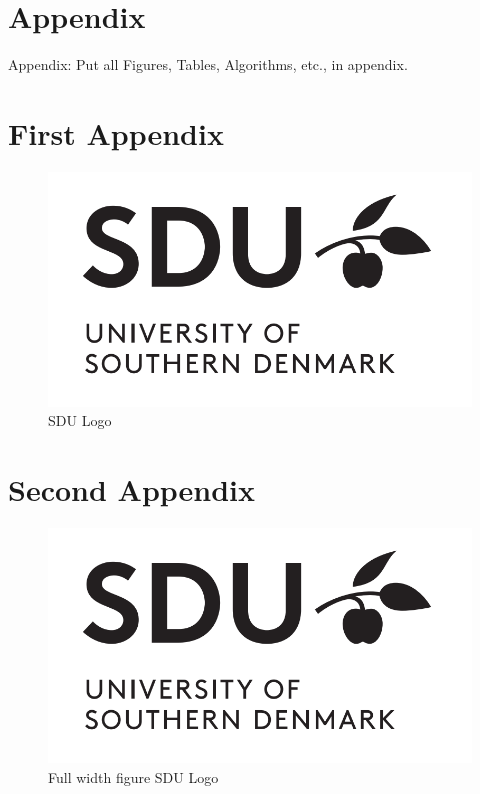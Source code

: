 \section*{Appendix}
\appendix
Appendix: Put all Figures, Tables, Algorithms, etc., in appendix.

\section{First Appendix}
\label{app:FirstAppendix}

\begin{figure}[tbh]
\includegraphics[width=.45\textwidth]{Images/sdu-logo.png}
\caption{SDU Logo}
\label{app:fig:SDULogo}
\end{figure}

\section{Second Appendix}
\label{app:SecondAppendix}

\begin{figure}[tbh]
\includegraphics[width=.95\textwidth]{Images/sdu-logo.png}
\caption{Full width figure SDU Logo}
\label{app:fig:SDULogoV2}
\end{figure}